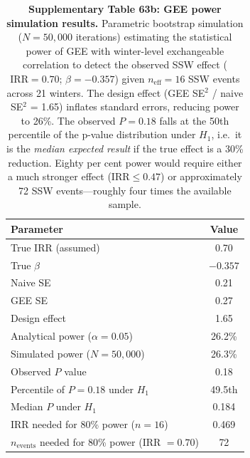 \documentclass[11pt,letterpaper]{article}
\begin{document}
\begin{table}[!ht]
\centering
\caption{\textbf{Supplementary Table 63b: GEE power simulation results.}
Parametric bootstrap simulation ($N = 50{,}000$ iterations) estimating the statistical power of GEE with winter-level exchangeable correlation to detect the observed SSW effect ($\mathrm{IRR} = 0.70$; $\beta = -0.357$) given $n_{\mathrm{eff}} = 16$ SSW events across 21 winters. The design effect (GEE SE$^2$ / naive SE$^2$ = 1.65) inflates standard errors, reducing power to 26\%. The observed $P = 0.18$ falls at the 50th percentile of the p-value distribution under $H_1$, i.e.\ it is the \emph{median expected result} if the true effect is a 30\% reduction. Eighty per cent power would require either a much stronger effect ($\mathrm{IRR} \leq 0.47$) or approximately 72 SSW events---roughly four times the available sample.}
\label{tab:power_sim}
\small
\begin{tabular}{lc}
\toprule
Parameter & Value \\
\midrule
True IRR (assumed) & 0.70 \\
True $\beta$ & $-0.357$ \\
Naive SE & 0.21 \\
GEE SE & 0.27 \\
Design effect & 1.65 \\
\midrule
Analytical power ($\alpha = 0.05$) & 26.2\% \\
Simulated power ($N = 50{,}000$) & 26.3\% \\
\midrule
Observed $P$ value & 0.18 \\
Percentile of $P = 0.18$ under $H_1$ & 49.5th \\
Median $P$ under $H_1$ & 0.184 \\
\midrule
IRR needed for 80\% power ($n = 16$) & 0.469 \\
$n_{\mathrm{events}}$ needed for 80\% power (IRR $= 0.70$) & 72 \\
\bottomrule
\end{tabular}
\end{table}
\end{document}

